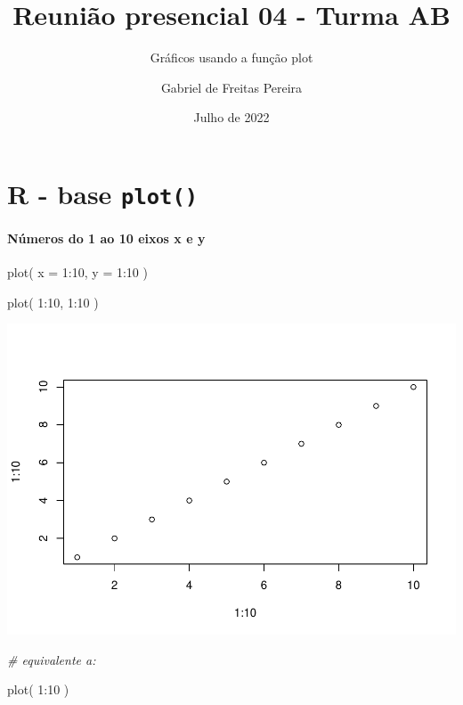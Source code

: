 \documentclass[
]{article}
\title{Reunião presencial 04 - Turma AB}
\subtitle{Gráficos usando a função plot}
\author{Gabriel de Freitas Pereira}
\date{Julho de 2022}
\newenvironment{Shaded}{\begin{snugshade}}{\end{snugshade}}
\newcommand{\AttributeTok}[1]{\textcolor[rgb]{0.77,0.63,0.00}{#1}}
\newcommand{\CommentTok}[1]{\textcolor[rgb]{0.56,0.35,0.01}{\textit{#1}}}
\newcommand{\DecValTok}[1]{\textcolor[rgb]{0.00,0.00,0.81}{#1}}
\newcommand{\FunctionTok}[1]{\textcolor[rgb]{0.00,0.00,0.00}{#1}}
\newcommand{\NormalTok}[1]{#1}
\newcommand{\SpecialCharTok}[1]{\textcolor[rgb]{0.00,0.00,0.00}{#1}}
\begin{document}
\maketitle

\hypertarget{r---base-plot}{%
\section{\texorpdfstring{R - base
\texttt{plot()}}{R - base plot()}}\label{r---base-plot}}

\hypertarget{nuxfameros-do-1-ao-10-eixos-x-e-y}{%
\paragraph{Números do 1 ao 10 eixos x e
y}\label{nuxfameros-do-1-ao-10-eixos-x-e-y}}

\begin{Shaded}
\begin{Highlighting}[]
\FunctionTok{plot}\NormalTok{( }\AttributeTok{x =} \DecValTok{1}\SpecialCharTok{:}\DecValTok{10}\NormalTok{, }\AttributeTok{y =} \DecValTok{1}\SpecialCharTok{:}\DecValTok{10}\NormalTok{ )}

\FunctionTok{plot}\NormalTok{( }\DecValTok{1}\SpecialCharTok{:}\DecValTok{10}\NormalTok{, }\DecValTok{1}\SpecialCharTok{:}\DecValTok{10}\NormalTok{ )}
\end{Highlighting}
\end{Shaded}

\includegraphics{presencial_função_plot_04_turma_B_files/figure-latex/unnamed-chunk-1-1.pdf}

\begin{Shaded}
\begin{Highlighting}[]
\CommentTok{\# equivalente a:}

\FunctionTok{plot}\NormalTok{( }\DecValTok{1}\SpecialCharTok{:}\DecValTok{10}\NormalTok{ )}
\end{Highlighting}
\end{Shaded}
\end{document}
